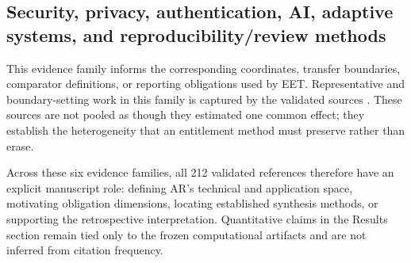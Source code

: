 \subsection{Security, privacy, authentication, AI, adaptive systems, and reproducibility/review methods}
This evidence family informs the corresponding coordinates, transfer boundaries, comparator definitions, or reporting obligations used by EET. Representative and boundary-setting work in this family is captured by the validated sources \cite{Cheng2024ARUISecurity,Kagami2026TagAlong,Kanellopoulos2026Diagnosing,Chen2026UbiGrip,Azuma1997Survey,Azuma2001Advances,Billinghurst2015Survey,Denning2014Bystanders,Corbett2023BystandAR,Huang2019SignReading,Islam2026ARAuthentication,Ethiraj2026AuthenticationReview,Yang2024SharedArtifact,Shi2025CARINGAI,Li2025Satori,Zhu2025AgentAR,Zhu2023EgoObjects,Xiu2026ContrAR,Donley2021EasyCom,Man2026NavigationMetaAnalysis,Arefin2025Replication,Balado2026AsBuiltXR,Angra2025ARVRReview,IEEE2048_101_2023,Scargill2024EnvironmentTexture,Quinn2024OutOfView,Vanukuru2023DualStream,VidalBalea2025AnchorSharing,DeGuzman2019SecurityPrivacy,Hallal2024AuthenticationXR,Alzahrani2022ARCybersecurity,Stephenson2022AuthenticationSoK,Merino2020MRAREvaluation,Banzi2026ReproducibilityConsensus,Guo2022EnvironmentHMD,Burri2016EuRoC,Bassyouni2021AIRobotics,Wu2026ConversationalAR,Mustapha2026AugmentedIntelligence,Wang2026ImmersiveAI,Page2021PRISMA,Rethlefsen2021PRISMAS,McGowan2016PRESS,Bramer2016Deduplication,Bramer2017DatabaseCombinations,FernandezMoyano2025IndustryImpact,Nikolaidis2022ReviewOfReviews,Stefanidi2024AROnTheMove,Salman2025SmartFacilities}. These sources are not pooled as though they estimated one common effect; they establish the heterogeneity that an entitlement method must preserve rather than erase.

Across these six evidence families, all 212 validated references therefore have an explicit manuscript role: defining AR's technical and application space, motivating obligation dimensions, locating established synthesis methods, or supporting the retrospective interpretation. Quantitative claims in the Results section remain tied only to the frozen computational artifacts and are not inferred from citation frequency.
